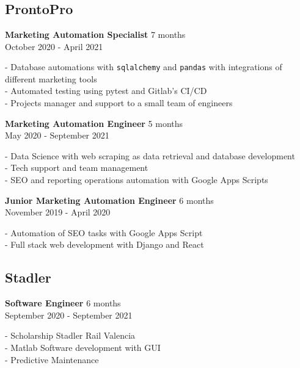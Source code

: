 \section{\faBriefcase} \label{sec:experience}

\subsection{ProntoPro}
\textbf{Marketing Automation Specialist} \hfill 7 months \\ 
{\footnotesize October 2020 - April 2021} \\
{
    \raggedright
    - Database automations with \texttt{sqlalchemy} and \texttt{pandas} with
    integrations of different marketing tools \\
    - Automated testing using pytest and Gitlab's CI/CD \\
    - Projects manager and support to a small team of engineers \\
}

\textbf{Marketing Automation Engineer} \hfill 5 months \\ 
{\footnotesize May 2020 - September 2021} \\
{
    \raggedright
    - Data Science with web scraping as data retrieval and database development
    \\
    - Tech support and team management \\
    - SEO and reporting operations automation with Google Apps Scripts \\
}

\textbf{Junior Marketing Automation Engineer} \hfill 6 months \\ 
{\footnotesize November 2019 - April 2020} \\
{
    \raggedright
    - Automation of SEO tasks with Google Apps Script \\
    - Full stack web development with Django and React \\
}

\medskip
\subsection{Stadler}
\textbf{Software Engineer} \hfill 6 months \\ 
{\footnotesize September 2020 - September 2021} \\
{
    \raggedright
    - Scholarship Stadler Rail Valencia \\
    - Matlab Software development with GUI \\
    - Predictive Maintenance \\
}